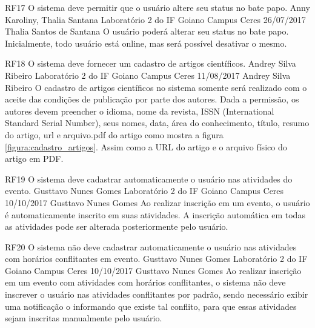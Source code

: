  \requisitoFuncional
 {RF17}
 {O sistema deve permitir que o usuário altere seu status no bate papo.}
 {Anny Karoliny, Thalia Santana}
 {Laboratório 2 do IF Goiano Campus Ceres}
 {26/07/2017}
 {Thalia Santos de Santana}
 { O usuário poderá alterar seu status no bate papo. Inicialmente, todo usuário está online, mas será possível desativar o mesmo.
 }	
 


\requisitoFuncional
 {RF18}
 {O sistema deve fornecer um cadastro de artigos científicos.}
 {Andrey Silva Ribeiro}
 {Laboratório 2 do IF Goiano Campus Ceres}
 {11/08/2017}
 {Andrey Silva Ribeiro}
 { O cadastro de artigos científicos no sistema somente será realizado com o aceite das condições de publicação por parte dos autores. Dada a permissão, os autores devem preencher o idioma, nome da revista, ISSN (International Standard Serial Number), seus nomes, data, área do conhecimento, título, resumo do artigo, url e arquivo.pdf do artigo como mostra a figura \ref{figura:cadastro_artigos}. Assim como a URL do artigo e o arquivo físico do artigo em PDF.
 }
 
 \requisitoFuncional
 {RF19}
 {O sistema deve cadastrar automaticamente o usuário nas atividades do evento.}
 {Gusttavo Nunes Gomes}
 {Laboratório 2 do IF Goiano Campus Ceres}
 {10/10/2017}
 {Gusttavo Nunes Gomes}
 { Ao realizar inscrição em um evento, o usuário é automaticamente inscrito em suas atividades. A inscrição automática em todas as atividades pode ser alterada posteriormente pelo usuário.
 }
 
  \requisitoFuncional
 {RF20}
 {O sistema não deve cadastrar automaticamente o usuário nas atividades com horários conflitantes em evento.}
 {Gusttavo Nunes Gomes}
 {Laboratório 2 do IF Goiano Campus Ceres}
 {10/10/2017}
 {Gusttavo Nunes Gomes}
 { Ao realizar inscrição em um evento com atividades com horários conflitantes, o sistema não deve inscrever o usuário nas atividades conflitantes por padrão, sendo necessário exibir uma notificação o informando que existe tal conflito, para que essas atividades sejam inscritas manualmente pelo usuário.
 }
